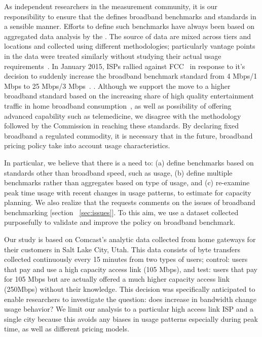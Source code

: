 As independent researchers in the measurement community, it is our responsibility to ensure that the
\FCC defines broadband benchmarks and standards in a sensible manner. Efforts to define such
benchmarks have always been based on aggregated data analysis by the \FCC. The source of data are
mixed across tiers and locations and collected using different methodologies; particularly vantage
points in the data were treated similarly without studying their actual usage
requirements~\cite{report2010-2014}.  In January 2015, ISPs rallied against FCC~\cite{fcc-redefine-ieee} in response to
it’s decision to suddenly increase the broadband benchmark standard from 4 Mbps/1 Mbps to 25 Mbps/3
Mbps~\cite{}. . Although we support the move to a higher broadband
standard based on the increasing share of high quality entertainment traffic in home broadband
consumption~\cite{sandvine2014report1,sandvine2014report2}, as well as possibility of offering
advanced capability such as telemedicine, we disagree with the methodology followed by the
Commission in reaching these standards. By declaring fixed broadband a regulated commodity, it is
necessary that in the future, broadband pricing policy take into account usage characteristics.

In particular, we believe that there is a need to: (a) define benchmarks based on standards other
than broadband speed, such as usage, (b) define multiple benchmarks rather than aggregates based on
type of usage, and (c) re-examine peak time usage with recent changes in usage patterns, to estimate
for capacity planning. We also realize that the \FCC requests comments on the issues of broadband
benchmarking [section ~\ref{sec:issues}]. To this aim, we use a dataset collected purposefully to
validate and improve the \FCC policy on broadband benchmark.


Our study is based on Comcast’s analytic data collected from home gateways for their customers in
Salt Lake City, Utah. This data consists of byte transfers collected continuously every 15 minutes
from two types of users; control: users that pay and use a high capacity access link (105 Mbps), and
test: users that pay for 105 Mbps but are actually offered a much higher capacity access link
(250Mbps) without their knowledge. This decision was specifically anticipated to enable researchers
to investigate the question: does increase in bandwidth change usage behavior? We limit our analysis
to a particular high access link ISP and a single city because this avoids any biases in usage
patterns especially during peak time, as well as different pricing models. 


